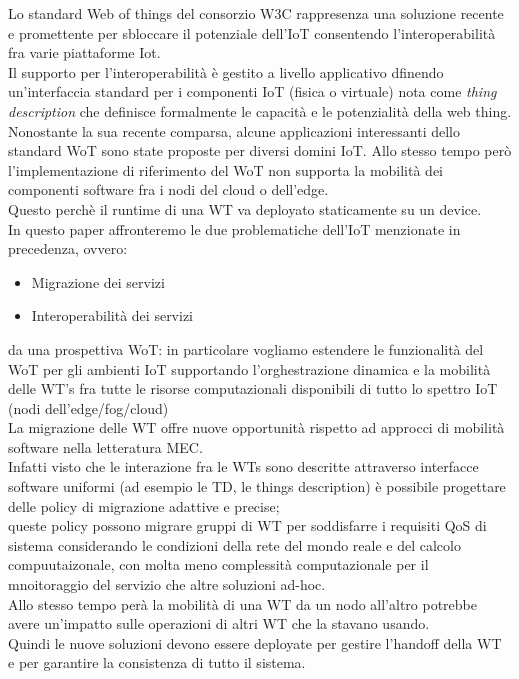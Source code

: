 \documentclass[11pt]{article}
\begin{document}
  
  Lo standard Web of things del consorzio W3C rappresenza una soluzione recente e promettente per sbloccare il potenziale dell'IoT consentendo l'interoperabilità fra varie piattaforme Iot.
  \\
  Il supporto per l'interoperabilità è gestito a livello applicativo dfinendo un'interfaccia standard per i componenti IoT (fisica o virtuale) nota come \textit{thing description} che definisce formalmente le capacità e le potenzialità della web thing. \\
  Nonostante la sua recente comparsa, alcune applicazioni interessanti dello standard WoT sono state proposte per diversi domini IoT.
  Allo stesso tempo però l'implementazione di riferimento del WoT non supporta la mobilità dei componenti software fra i nodi del cloud o dell'edge. \\
  Questo perchè il runtime di una WT va deployato staticamente su un device.
  \\
  In questo paper affronteremo le due problematiche dell'IoT menzionate in precedenza, ovvero:
  \begin{itemize}
  	\item Migrazione dei servizi
  	\item Interoperabilità dei servizi
  \end{itemize}
  da una prospettiva WoT: in particolare vogliamo estendere le funzionalità del WoT per gli ambienti IoT supportando l'orghestrazione dinamica e la mobilità delle WT's fra tutte le risorse computazionali disponibili di tutto lo spettro IoT (nodi dell'edge/fog/cloud) \\
  La migrazione delle WT offre nuove opportunità rispetto ad approcci di mobilità software nella letteratura MEC.
  \\
  Infatti visto che le interazione fra le WTs sono descritte attraverso interfacce software uniformi (ad esempio le TD, le things description) è possibile progettare delle policy di migrazione adattive e precise; \\
  queste policy possono migrare gruppi di WT per soddisfarre i requisiti QoS di sistema considerando le condizioni della rete del mondo reale e del calcolo compuutaizonale, con molta meno complessità computazionale per il mnoitoraggio del servizio che altre soluzioni ad-hoc. \\
  Allo stesso tempo perà la mobilità di una WT da un nodo all'altro potrebbe avere un'impatto sulle operazioni di altri WT che la stavano usando. \\
  Quindi le nuove soluzioni devono essere deployate per gestire l'handoff della WT e per garantire la consistenza di tutto il sistema.\\
\end{document}
